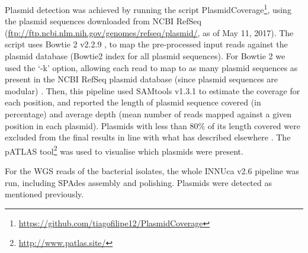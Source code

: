Plasmid detection was achieved by running the script PlasmidCoverage\footnote{\url{https://github.com/tiagofilipe12/PlasmidCoverage}}, using the plasmid sequences downloaded from NCBI RefSeq (\url{ftp://ftp.ncbi.nlm.nih.gov/genomes/refseq/plasmid/}, as of May 11, 2017). 
The script uses Bowtie 2 v2.2.9 \citep{langmead_fast_2012}, to map the pre-processed input reads against the plasmid database (Bowtie2 index for all plasmid sequences). 
For Bowtie 2 we used the ‘-k’ option, allowing each read to map to as many plasmid sequences as present in the NCBI RefSeq plasmid database (since plasmid sequences are modular) \citep{smillie_mobility_2010, barcia_identification_2011}. 
Then, this pipeline used SAMtools v1.3.1 \citep{li_sequence_2009} to estimate the coverage for each position, and reported the length of plasmid sequence covered (in percentage) and average depth (mean number of reads mapped against a given position in each plasmid). 
Plasmids with less than 80\% of its length covered were excluded from the final results in line with what has described elsewhere \citep{jitwasinkul_plasmid_2016}. The pATLAS tool\footnote{\url{http://www.patlas.site/}} was used to visualise which plasmids were present.

For the WGS reads of the bacterial isolates, the whole INNUca v2.6 pipeline was run, including SPAdes assembly and polishing. 
Plasmids were detected as mentioned previously.

